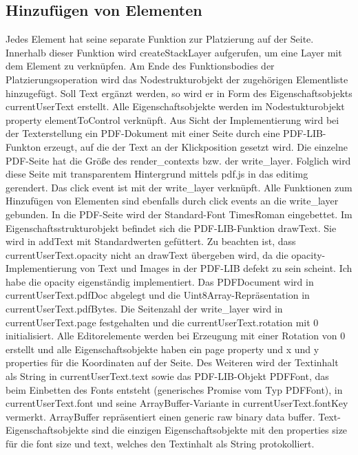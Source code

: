 \subsection{Hinzufügen von Elementen}
Jedes Element hat seine separate Funktion zur Platzierung auf der Seite. Innerhalb dieser Funktion wird createStackLayer aufgerufen, um eine Layer mit dem Element zu verknüpfen. Am Ende des Funktionsbodies der Platzierungsoperation wird das Nodestrukturobjekt der zugehörigen Elementliste hinzugefügt. Soll Text ergänzt werden, so wird er in Form des Eigenschaftsobjekts currentUserText erstellt. Alle Eigenschaftsobjekte werden im Nodestukturobjekt property elementToControl verknüpft. Aus Sicht der Implementierung wird bei der Texterstellung ein PDF-Dokument mit einer Seite durch eine PDF-LIB-Funkton erzeugt, auf die der Text an der Klickposition gesetzt wird. Die einzelne PDF-Seite hat die Größe des render\_contexts bzw. der write\_layer. Folglich wird diese Seite mit transparentem Hintergrund mittels pdf.js in das editimg gerendert. Das click event ist mit der write\_layer verknüpft. Alle Funktionen zum Hinzufügen von Elementen sind ebenfalls durch click events an die write\_layer gebunden. In die PDF-Seite wird der Standard-Font TimesRoman eingebettet. Im Eigenschaftsstrukturobjekt befindet sich die PDF-LIB-Funktion drawText. Sie wird in addText mit Standardwerten gefüttert. Zu beachten ist, dass currentUserText.opacity nicht an drawText übergeben wird, da die opacity-Implementierung von Text und Images in der PDF-LIB defekt zu sein scheint. Ich habe die opacity eigenständig implementiert. Das PDFDocument wird in currentUserText.pdfDoc abgelegt und die Uint8Array-Repräsentation in currentUserText.pdfBytes. Die Seitenzahl der write\_layer wird in currentUserText.page festgehalten und die currentUserText.rotation mit 0 initialisiert. Alle Editorelemente werden bei Erzeugung mit einer Rotation von 0 erstellt und alle Eigenschaftsobjekte haben ein page property und x und y properties für die Koordinaten auf der Seite. Des Weiteren wird der Textinhalt als String in currentUserText.text sowie das PDF-LIB-Objekt PDFFont, das beim Einbetten des Fonts entsteht (generisches Promise vom Typ PDFFont), in currentUserText.font und seine ArrayBuffer-Variante in currentUserText.fontKey vermerkt. ArrayBuffer repräsentiert einen generic raw binary data buffer. Text-Eigenschaftsobjekte sind die einzigen Eigenschaftsobjekte mit den properties size für die font size und text, welches den Textinhalt als String protokolliert.
\par
